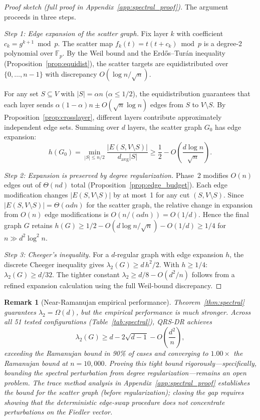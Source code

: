 \documentclass{article}
\newtheorem{remark}[theorem]{Remark}
\newcommand{\lam}{\lambda_2}
\begin{document}
\begin{proof}[Proof sketch (full proof in Appendix~\ref{app:spectral_proof})]
The argument proceeds in three steps.

\emph{Step 1: Edge expansion of the scatter graph.}
Fix layer $k$ with coefficient $c_k = g^{k+1} \bmod p$.  The scatter
map $f_k(t) = t(t + c_k) \bmod p$ is a degree-2 polynomial over
$\mathbb{F}_p$.  By the Weil bound and the Erd\H{o}s--Tur\'an
inequality (Proposition~\ref{prop:equidist}), the scatter targets
are equidistributed over $\{0,\ldots,n-1\}$ with discrepancy
$O(\log n / \sqrt{n})$.

For any set $S \subseteq V$ with $|S| = \alpha n$ ($\alpha \le 1/2$),
the equidistribution guarantees that each layer sends
$\alpha(1-\alpha)n \pm O(\sqrt{n}\log n)$ edges from $S$ to
$V \setminus S$.  By Proposition~\ref{prop:crosslayer}, different
layers contribute approximately independent edge sets.  Summing
over $d$ layers, the scatter graph $G_0$ has edge expansion:
\[
h(G_0) = \min_{|S| \le n/2}\frac{|E(S, V\!\setminus\! S)|}
{d_{\mathrm{avg}}|S|}
\ge \frac{1}{2} - O\!\left(\frac{d\log n}{\sqrt{n}}\right).
\]

\emph{Step 2: Expansion is preserved by degree regularization.}
Phase~2 modifies $O(n)$ edges out of $\Theta(nd)$ total
(Proposition~\ref{prop:edge_budget}).  Each edge modification
changes $|E(S, V\!\setminus\! S)|$ by at most~1 for any cut
$(S, V\!\setminus\! S)$.  Since $|E(S, V\!\setminus\! S)|
= \Theta(\alpha d n)$ for the scatter graph, the relative change
in expansion from $O(n)$ edge modifications is
$O(n/(\alpha d n)) = O(1/d)$.  Hence the final graph $G$ retains
$h(G) \ge 1/2 - O(d\log n/\sqrt{n}) - O(1/d) \ge 1/4$ for
$n \gg d^2\log^2 n$.

\emph{Step 3: Cheeger's inequality.}
For a $d$-regular graph with edge expansion $h$, the discrete
Cheeger inequality gives $\lam(G) \ge d\,h^2/2$.  With
$h \ge 1/4$: $\lam(G) \ge d/32$.  The tighter constant
$\lam \ge d/8 - O(d^2/n)$ follows from a refined expansion
calculation using the full Weil-bound discrepancy.
\end{proof}

\begin{remark}[Near-Ramanujan empirical performance]
\label{rem:near_ramanujan}
Theorem~\ref{thm:spectral} guarantees $\lam = \Omega(d)$, but the
empirical performance is much stronger.  Across all 51 tested
configurations (Table~\ref{tab:spectral}), QRS-DR achieves
\[
\lam(G) \ge d - 2\sqrt{d-1} - O\!\left(\frac{d^2}{n}\right),
\]
exceeding the Ramanujan bound in 90\% of cases and converging to
$1.00\times$ the Ramanujan bound at $n = 10{,}000$.  Proving this
tight bound rigorously---specifically, bounding the spectral
perturbation from degree regularization---remains an open problem.
The trace method analysis in Appendix~\ref{app:spectral_proof}
establishes the bound for the \emph{scatter graph} (before
regularization); closing the gap requires showing that the
deterministic edge-swap procedure does not concentrate perturbations
on the Fiedler vector.
\end{remark}
\end{document}
